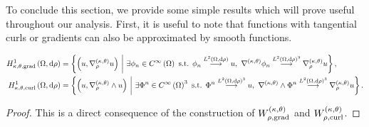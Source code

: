 To conclude this section, we provide some simple results which will prove useful throughout our analysis.
First, it is useful to note that functions with tangential curls or gradients can also be approximated by smooth functions.
\begin{cory} \label{cory:SobSpaceApproxSequences}
	\begin{align*}
		\ktgradSob{\ddom}{\rho} &= \clbracs{ \bracs{u, \ktgrad_{\rho}u} \setVert \exists\phi_n\in\smooth{\ddom} \text{ s.t. } \phi_n\lconv{\ltwo{\ddom}{\rho}}u, \ \ktgrad\phi_n\lconv{\ltwo{\ddom}{\rho}^3}\ktgrad_{\rho}u }, \\
		\ktcurlSob{\ddom}{\rho} &= \clbracs{ \bracs{u, \ktcurl{\rho}u} \setVert \exists\Phi^n\in\smooth{\ddom}^3 \text{ s.t. } \Phi^n\lconv{\ltwo{\ddom}{\rho}^3}u, \ \ktcurl{}\Phi^n\lconv{\ltwo{\ddom}{\rho}^3}\ktgrad_{\rho}u }.
	\end{align*}
\end{cory}
\begin{proof}
	This is a direct consequence of the construction of $W^{\left( \kappa, \theta \right)}_{\rho,\mathrm{grad}}$ and $W^{\left( \kappa, \theta \right)}_{\rho,\mathrm{curl}}$.
\end{proof}

